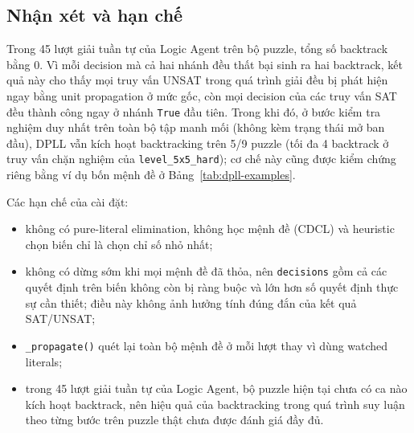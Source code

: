 \subsection{Nhận xét và hạn chế}
Trong 45 lượt giải tuần tự của Logic Agent trên bộ puzzle, tổng số backtrack
bằng 0. Vì mỗi decision mà cả hai nhánh đều thất bại sinh ra hai backtrack,
kết quả này cho thấy mọi truy vấn UNSAT trong quá trình giải đều bị phát hiện
ngay bằng unit propagation ở mức gốc, còn mọi decision của các truy vấn SAT
đều thành công ngay ở nhánh \texttt{True} đầu tiên. Trong khi đó, ở bước kiểm
tra nghiệm duy nhất trên toàn bộ tập manh mối (không kèm trạng thái mở ban
đầu), DPLL vẫn kích hoạt backtracking trên 5/9 puzzle (tối đa 4 backtrack ở
truy vấn chặn nghiệm của \texttt{level\_5x5\_hard}); cơ chế này cũng được
kiểm chứng riêng bằng ví dụ bốn mệnh đề ở Bảng~\ref{tab:dpll-examples}.

Các hạn chế của cài đặt:
\begin{itemize}
    \item không có pure-literal elimination, không học mệnh đề (CDCL) và
    heuristic chọn biến chỉ là chọn chỉ số nhỏ nhất;
    \item không có dừng sớm khi mọi mệnh đề đã thỏa, nên \texttt{decisions}
    gồm cả các quyết định trên biến không còn bị ràng buộc và lớn hơn số
    quyết định thực sự cần thiết; điều này không ảnh hưởng tính đúng đắn của
    kết quả SAT/UNSAT;
    \item \texttt{\_propagate()} quét lại toàn bộ mệnh đề ở mỗi lượt thay vì
    dùng watched literals;
    \item trong 45 lượt giải tuần tự của Logic Agent, bộ puzzle hiện tại chưa
    có ca nào kích hoạt backtrack, nên hiệu quả của backtracking trong quá
    trình suy luận theo từng bước trên puzzle thật chưa được đánh giá đầy đủ.
\end{itemize}